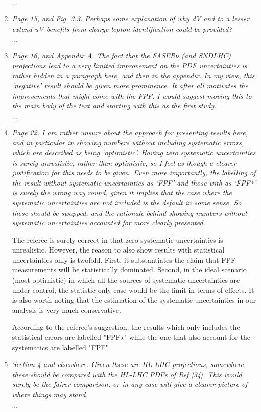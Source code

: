 \documentclass[11pt,a4paper]{article}
\begin{document}
\begin{enumerate}
	$\cdots$
	
	\item {\it Page 15, and Fig. 3.3. Perhaps some explanation of why dV and to a lesser extend uV
		benefits from charge-lepton identification could be provided?
	}
	
	$\cdots$
	
	\item {\it Page 16, and Appendix A. The fact that the FASER$\nu$ (and SNDLHC) projections lead
		to a very limited improvement on the PDF uncertainties is rather hidden in a paragraph
		here, and then in the appendix. In my view, this ‘negative’ result should be given more
		prominence. It after all motivates the improvements that might come with the FPF. I
		would suggest moving this to the main body of the text and starting with this as the
		first study.
	}
	
	$\cdots$
	
	\item {\it Page 22. I am rather unsure about the approach for presenting results here, and in
		particular in showing numbers without including systematic errors, which are described
		as being ‘optimistic’. Having zero systematic uncertainties is surely unrealistic, rather
		than optimistic, so I feel as though a clearer justification for this needs to be given.
		Even more importantly, the labelling of the result without systematic uncertainties as
		‘FPF’ and those with as ‘FPF*’ is surely the wrong way round, given it implies that
		the case where the systematic uncertainties are not included is the default in some
		sense. So these should be swapped, and the rationale behind showing numbers without
		systematic uncertainties accounted for more clearly presented.
	}
	
	The referee is surely correct in that zero-systematic uncertainties is unrealistic. However,
	the reason to also show results with statistical uncertainties only is twofold. First, it
	substantiates the claim that FPF measurements will be statistically dominated. Second, in the
	ideal scenario (most optimistic) in which all the sources of systematic uncertainties are 
	under control, the statistic-only case would be the limit in terms of effects. It is also 
	worth noting that the estimation of the systematic uncertainties in our analysis is very 
	much conservative.
	
	According to the referee's suggestion, the results which only includes the statistical errors
	are labelled "FPF$\star$" while the one that also account for the systematics are labelled "FPF".
	
	\item {\it Section 4 and elsewhere. Given these are HL-LHC projections, somewhere these should
		be compared with the HL-LHC PDFs of Ref [34]. This would surely be the fairer
		comparison, or in any case will give a clearer picture of where things may stand.
	}
	
	$\cdots$

\end{enumerate}
	
	
\end{document}

